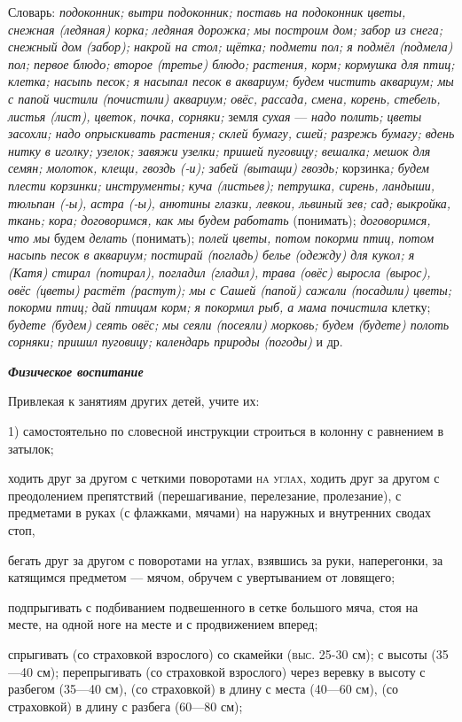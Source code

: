 \documentclass{book}
\renewcommand{\emph}[1]{\textit{#1}}
\begin{document}
Словарь: \emph{подоконник; вытри подоконник; поставь на подоконник
цветы, снежная (ледяная) корка; ледяная дорожка; мы построим дом; забор
из снега; снежный дом (забор); накрой на стол; щётка; подмети пол; я
подмёл (подмела) пол; первое блюдо; второе (третье) блюдо; растения,
корм; кормушка для птиц; клетка; насыпь песок; я насыпал песок в
аквариум; будем чистить аквариум; мы с папой чистили (почистили)
аквариум; овёс, рассада,} \emph{смена, корень, стебель, листья (лист),
цветок, почка, сорняки;} земля \emph{сухая} --- \emph{надо полить; цветы
засохли; надо опрыскивать растения; склей бумагу, сшей; разрежь бумагу;
вдень нитку в иголку; узелок; завяжи узелки; пришей пуговицу; вешалка;
мешок для семян; молоток, клещи, гвоздь (-и); забей (вытащи) гвоздь;}
корзинка\emph{; будем плести корзинки; инструменты; куча (листьев);
петрушка, сирень, ландыши, тюльпан (-ы), астра (-ы), анютины глазки,
левкои, львиный зев; сад; выкройка, ткань; кора; договоримся, как мы
будем работать} (понимать); \emph{договоримся, что мы} будем
\emph{делать} (понимать); \emph{полей цветы, потом покорми птиц, потом
насыпь песок в аквариум; постирай (погладь) белье (одежду) для кукол; я
(Катя) стирал (потирал), погладил (гладил),} \emph{трава (овёс) выросла
(вырос), овёс (цветы) растёт (растут); мы с Сашей (папой) сажали
(посадили) цветы; покорми птиц; дай птицам корм; я покормил рыб, а мама
почистила} клетку; \emph{будете (будем) сеять овёс; мы сеяли (посеяли)
морковь; будем (будете) полоть сорняки; пришил пуговицу; календарь
природы (погоды)} и др.

\emph{\textbf{Физическое воспитание}}

Привлекая к занятиям других детей, учите их:

1) самостоятельно по словесной инструкции строиться в колонну с
равнением в затылок;

ходить друг за другом с четкими поворотами \textsc{на углах,} ходить
друг за другом с преодолением препятствий (перешагивание, перелезание,
пролезание), с предметами в руках (с флажками, мячами) на наружных и
внутренних сводах стоп,

бегать друг за другом с поворотами на углах, взявшись за руки,
наперегонки, за катящимся предметом --- мячом, обручем с увертыванием от
ловящего;

подпрыгивать с подбиванием подвешенного в сетке большого мяча, стоя на
месте, на одной ноге на месте и с продвижением вперед;

спрыгивать (со страховкой взрослого) со скамейки \textsc{(выс. 25-}30
см); с высоты (35---40 см); перепрыгивать (со страховкой взрослого)
через веревку в высоту с разбегом (35---40 см), (со страховкой) в длину
с места (40---60 см), (со страховкой) в длину с разбега (60---80 см);
\end{document}
